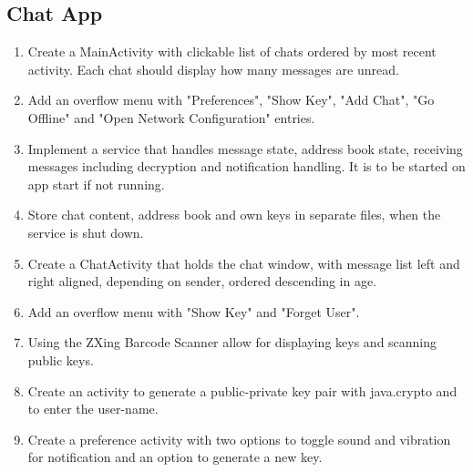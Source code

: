\subsection{Chat App}
	\begin{enumerate}
		\item Create a MainActivity with clickable list of chats ordered by most recent activity. Each chat should display how many messages are unread.
		\item Add an overflow menu with "Preferences", "Show Key", "Add Chat", "Go Offline" and "Open Network Configuration" entries.
		\item Implement a service that handles message state, address book state, receiving messages including decryption and notification handling. It is to be started on app start if not running.
		\item Store chat content, address book and own keys in separate files, when the service is shut down.
		\item Create a ChatActivity that holds the chat window, with message list left and right aligned, depending on sender, ordered descending in age.
		\item Add an overflow menu with "Show Key" and "Forget User".
		\item Using the ZXing Barcode Scanner allow for displaying keys and scanning public keys.
		\item Create an activity to generate a public-private key pair with java.crypto and to enter the user-name.
		\item Create a preference activity with two options to toggle sound and vibration for notification and an option to generate a new key.
	\end{enumerate}
			